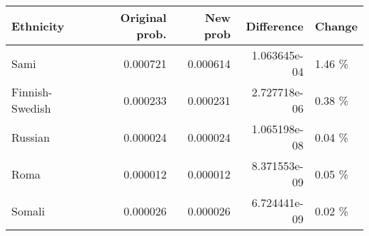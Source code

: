 \begin{tabular}{lrrrl}
\toprule
      Ethnicity &  Original prob. &  New prob &   Difference & Change \\
\midrule
           Sami &        0.000721 &  0.000614 & 1.063645e-04 & 1.46 \% \\
Finnish-Swedish &        0.000233 &  0.000231 & 2.727718e-06 & 0.38 \% \\
        Russian &        0.000024 &  0.000024 & 1.065198e-08 & 0.04 \% \\
           Roma &        0.000012 &  0.000012 & 8.371553e-09 & 0.05 \% \\
         Somali &        0.000026 &  0.000026 & 6.724441e-09 & 0.02 \% \\
\bottomrule
\end{tabular}
